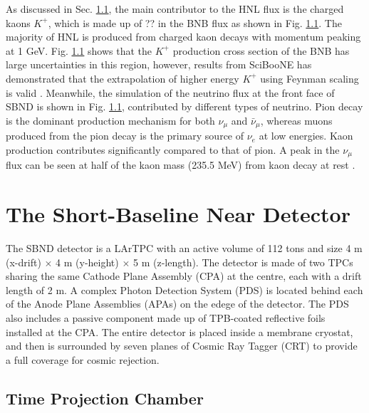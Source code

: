 As discussed in Sec. \ref{}, the main contributor to the HNL flux is the charged kaons $K^{+}$, which is made up of ?? in the BNB flux as shown in Fig. \ref{}.
The majority of HNL is produced from charged kaon decays with momentum peaking at 1 GeV.
Fig. \ref{} shows that the $K^{+}$ production cross section of the BNB has large uncertainties in this region, however, results from SciBooNE has demonstrated that the extrapolation of higher energy $K^{+}$ using Feynman scaling is valid \cite{}. 
Meanwhile, the simulation of the neutrino flux at the front face of SBND is shown in Fig. \ref{}, contributed by different types of neutrino.
Pion decay is the dominant production mechanism for both $\nu_{\mu}$ and $\bar{\nu}_{\mu}$, whereas muons produced from the pion decay is the primary source of $\nu_{e}$ at low energies.
Kaon production contributes significantly compared to that of pion.
A peak in the $\nu_{\mu}$ flux can be seen at half of the kaon mass (235.5 MeV) from kaon decay at rest \cite{}.



\section{The Short-Baseline Near Detector}

The SBND detector is a LArTPC with an active volume of 112 tons and size 4 m (x-drift) $\times$ 4 m (y-height) $\times$ 5 m (z-length).
The detector is made of two TPCs sharing the same Cathode Plane Assembly (CPA) at the centre, each with a drift length of 2 m.
A complex Photon Detection System (PDS) is located behind each of the Anode Plane Assemblies (APAs) on the edege of the detector.
The PDS also includes a passive component made up of TPB-coated reflective foils installed at the CPA.
The entire detector is placed inside a membrane cryostat, and then is surrounded by seven planes of Cosmic Ray Tagger (CRT) to provide a full coverage for cosmic rejection.

\subsection{Time Projection Chamber}


